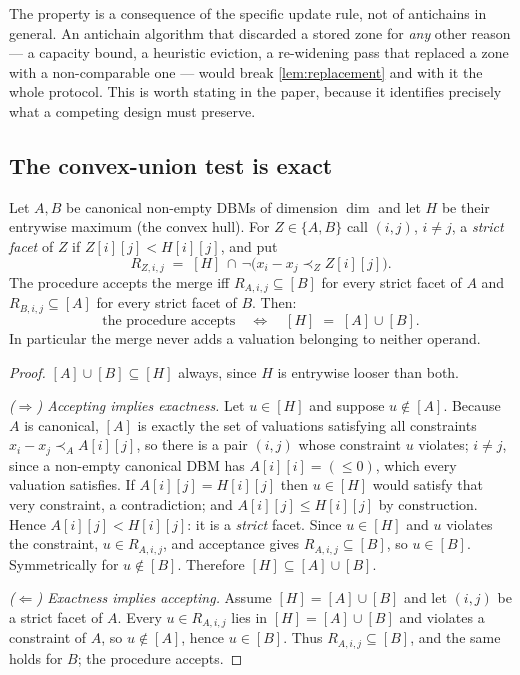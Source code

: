\begin{remark}
The property is a consequence of the specific update rule, not of antichains in
general.  An antichain algorithm that discarded a stored zone for \emph{any}
other reason --- a capacity bound, a heuristic eviction, a re-widening pass that
replaced a zone with a non-comparable one --- would break
\cref{lem:replacement} and with it the whole protocol.  This is worth stating in
the paper, because it identifies precisely what a competing design must
preserve.
\end{remark}

\subsection{The convex-union test is exact}

\begin{theorem}\label{thm:hull}
Let $A, B$ be canonical non-empty DBMs of dimension $\dim$ and let $H$ be their
entrywise maximum (the convex hull).  For $Z \in \{A,B\}$ call $(i,j)$, $i \ne
j$, a \emph{strict facet} of $Z$ if $Z[i][j] < H[i][j]$, and put
\[
  R_{Z,i,j} \;=\; [H] \,\cap\, \neg\big(x_i - x_j \prec_{Z} Z[i][j]\big).
\]
The procedure  accepts the merge iff
$R_{A,i,j} \subseteq [B]$ for every strict facet of $A$ and
$R_{B,i,j} \subseteq [A]$ for every strict facet of $B$.  Then:
\[
  \text{the procedure accepts}
  \quad\Longleftrightarrow\quad
  [H] \;=\; [A] \cup [B].
\]
In particular the merge never adds a valuation belonging to neither operand.
\end{theorem}

\begin{proof}
$[A]\cup[B] \subseteq [H]$ always, since $H$ is entrywise looser than both.

\emph{($\Rightarrow$) Accepting implies exactness.}
Let $u \in [H]$ and suppose $u \notin [A]$.  Because $A$ is canonical, $[A]$ is
exactly the set of valuations satisfying all constraints
$x_i - x_j \prec_A A[i][j]$, so there is a pair $(i,j)$ whose constraint $u$
violates; $i \ne j$, since a non-empty canonical DBM has $A[i][i] = (\le 0)$,
which every valuation satisfies.  If $A[i][j] = H[i][j]$ then $u \in [H]$ would
satisfy that very constraint, a contradiction; and $A[i][j] \le H[i][j]$ by
construction.  Hence $A[i][j] < H[i][j]$: it is a \emph{strict} facet.  Since
$u \in [H]$ and $u$ violates the constraint, $u \in R_{A,i,j}$, and acceptance
gives $R_{A,i,j} \subseteq [B]$, so $u \in [B]$.  Symmetrically for
$u \notin [B]$.  Therefore $[H] \subseteq [A]\cup[B]$.

\emph{($\Leftarrow$) Exactness implies accepting.}
Assume $[H] = [A]\cup[B]$ and let $(i,j)$ be a strict facet of $A$.  Every
$u \in R_{A,i,j}$ lies in $[H] = [A]\cup[B]$ and violates a constraint of $A$,
so $u \notin [A]$, hence $u \in [B]$.  Thus $R_{A,i,j} \subseteq [B]$, and the
same holds for $B$; the procedure accepts.
\end{proof}

